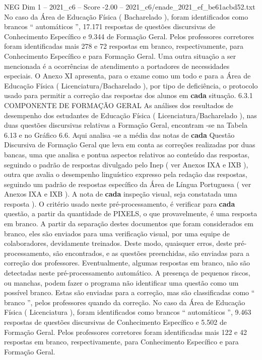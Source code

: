 \begin{textsample}{NEG Dim 1 – 2021\_c6 – Score -2.00 – 2021\_c6/enade\_2021\_ef\_be61acbd52.txt}
No caso da Área de Educação Física ( Bacharelado ), foram identificados como brancos “ automáticos ”, 17.171 respostas de questões discursivas de Conhecimento Específico e 9.344 de Formação Geral.
Pelos professores corretores foram identificadas mais 278 e 72 respostas em branco, respectivamente, para Conhecimento Específico e para Formação Geral.
Uma outra situação a ser mencionada é a ocorrências de atendimento a portadores de necessidades especiais.
O Anexo XI apresenta, para o exame como um todo e para a Área de Educação Física ( Licenciatura/Bacharelado ), por tipo de deficiência, o protocolo usado para permitir a correção das respostas dos alunos em \textbf{cada} situação. 6.3.1 COMPONENTE DE FORMAÇÃO GERAL As análises dos resultados de desempenho dos estudantes de Educação Física ( Licenciatura/Bacharelado ), nas duas questões discursivas relativas a Formação Geral, encontram -se na Tabela 6.13 e no Gráfico 6.6.
Aqui analisa -se a média das notas de \textbf{cada} Questão Discursiva de Formação Geral que leva em conta as correções realizadas por duas bancas, uma que analisa e pontua aspectos relativos ao conteúdo das respostas, seguindo o padrão de respostas divulgado pelo Inep ( ver Anexos IXA e IXB ), outra que avalia o desempenho linguístico expresso pela redação das respostas, seguindo um padrão de respostas específico da Área de Língua Portuguesa ( ver Anexos IXA e IXB ).
A nota de \textbf{cada} inspeção visual, seja constatada uma resposta ).
O critério usado neste pré-processamento, é verificar para \textbf{cada} questão, a partir da quantidade de PIXELS, o que provavelmente, é uma resposta em branco.
A partir da separação destes documentos que foram considerados em branco, eles são enviados para uma verificação visual, por uma equipe de colaboradores, devidamente treinados.
Deste modo, quaisquer erros, deste pré-processamento, são encontrados, e as questões preenchidas, são enviadas para a correção dos professores.
Eventualmente, algumas respostas em branco, não são detectadas neste pré-processamento automático.
A presença de pequenos riscos, ou manchas, podem fazer o programa não identificar uma questão como um possível branco.
Estas são enviadas para a correção, mas são classificadas como “ branco ”, pelos professores quando da correção.
No caso da Área de Educação Física ( Licenciatura ), foram identificados como brancos “ automáticos ”, 9.463 respostas de questões discursivas de Conhecimento Específico e 5.502 de Formação Geral.
Pelos professores corretores foram identificadas mais 122 e 42 respostas em branco, respectivamente, para Conhecimento Específico e para Formação Geral.

\end{textsample}

